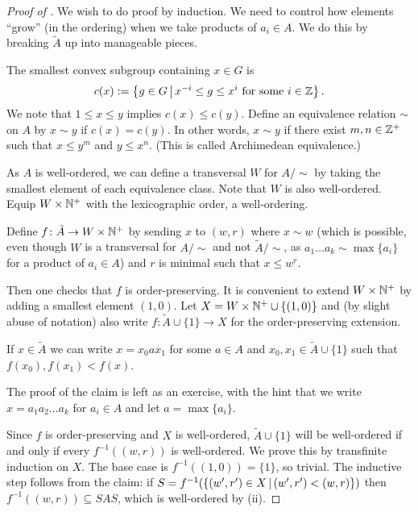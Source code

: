 \begin{proof}[Proof of ]
    We wish to do proof by induction.
    We need to control how elements ``grow'' (in the ordering) when we take products of $a_i \in A$.
    We do this by breaking $\tilde{A}$ up into manageable pieces.

    The smallest convex subgroup containing $x \in G$ is \[
        c(x) := \left\{ g \in G \,\middle|\, x^{-i} \leq g \leq x^i \text{ for some } i \in \mathbb{Z} \right\}.
    \]
    We note that $1 \leq x \leq y$ implies $c(x) \leq c(y)$.
    Define an equivalence relation $\sim$ on $A$ by $x \sim y$ if $c(x) = c(y)$.
    In other words, $x \sim y$ if there exist $m, n \in \mathbb{Z}^+$ such that $x \leq y^m$ and $y \leq x^n$.
    (This is called Archimedean equivalence.)

    As $A$ is well-ordered, we can define a transversal $W$ for $A / {\sim}$ by taking the smallest element of each equivalence class.
    Note that $W$ is also well-ordered.
    Equip $W \times \mathbb{N}^+$ with the lexicographic order, a well-ordering.

    Define $f \colon \tilde{A} \to W \times \mathbb{N}^+$ by sending $x$ to $(w, r)$ where $x \sim w$ (which is possible, even though $W$ is a transversal for $A / {\sim}$ and not $\tilde{A} / {\sim}$, as $a_1 \dots a_k \sim \max \{a_i\}$ for a product of $a_i \in A$) and $r$ is minimal such that $x \leq w^r$.

    Then one checks that $f$ is order-preserving.
    It is convenient to extend $W \times \mathbb{N}^+$ by adding a smallest element $(1, 0)$.
    Let $X = W \times \mathbb{N}^+ \cup \{ (1, 0) \}$ and (by slight abuse of notation) also write $f \colon \tilde{A} \cup \{1\} \to X$ for the order-preserving extension.

    \begin{claim}
        If $x \in \tilde{A}$ we can write $x = x_0 a x_1$ for some $a \in A$ and $x_0, x_1 \in \tilde{A} \cup \{1\}$ such that $f(x_0), f(x_1) < f(x)$.
    \end{claim}

    The proof of the claim is left as an exercise, with the hint that we write $x = a_1 a_2 \dots a_k$ for $a_i \in A$ and let $a = \max \{a_i\}$.

    Since $f$ is order-preserving and $X$ is well-ordered, $\tilde{A} \cup \{1\}$ will be well-ordered if and only if every $f^{-1}((w,r))$ is well-ordered.
    We prove this by transfinite induction on $X$.
    The base case is $f^{-1}((1, 0)) = \{1\}$, so trivial.
    The inductive step follows from the claim: if $S = f^{-1} (\left\{ (w', r') \in X \,\middle|\, (w', r') < (w, r) \right\})$ then $f^{-1}((w, r)) \subseteq SAS$, which is well-ordered by  (ii).
\end{proof}
